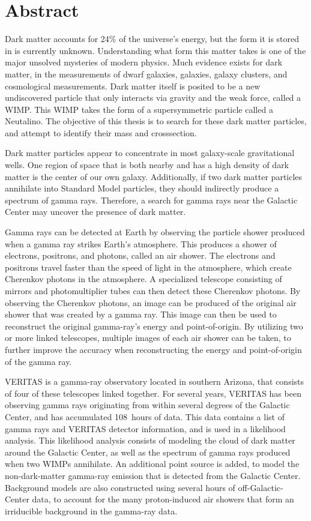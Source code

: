 \cleartooddpage[\thispagestyle{empty}]
\section*{Abstract}

Dark matter accounts for 24\% of the universe's energy, but the form it is stored in is currently unknown.
Understanding what form this matter takes is one of the major unsolved mysteries of modern physics.
Much evidence exists for dark matter, in the measurements of dwarf galaxies, galaxies, galaxy clusters, and cosmological measurements.
Dark matter itself is posited to be a new undiscovered particle that only interacts via gravity and the weak force, called a WIMP.
This WIMP takes the form of a supersymmetric particle called a Neutalino.
The objective of this thesis is to search for these dark matter particles, and attempt to identify their mass and crosssection.

Dark matter particles appear to concentrate in most galaxy-scale gravitational wells.
One region of space that is both nearby and has a high density of dark matter is the center of our own galaxy.
Additionally, if two dark matter particles annihilate into Standard Model particles, they should indirectly produce a spectrum of gamma rays.
Therefore, a search for gamma rays near the Galactic Center may uncover the presence of dark matter.

Gamma rays can be detected at Earth by observing the particle shower produced when a gamma ray strikes Earth's atmosphere.
This produces a shower of electrons, positrons, and photons, called an air shower.
The electrons and positrons travel faster than the speed of light in the atmosphere, which create Cherenkov photons in the atmosphere.
A specialized telescope consisting of mirrors and photomultiplier tubes can then detect these Cherenkov photons.
By observing the Cherenkov photons, an image can be produced of the original air shower that was created by a gamma ray.
This image can then be used to reconstruct the original gamma-ray's energy and point-of-origin.
By utilizing two or more linked telescopes, multiple images of each air shower can be taken, to further improve the accuracy when reconstructing the energy and point-of-origin of the gamma ray.

VERITAS is a gamma-ray observatory located in southern Arizona, that consists of four of these telescopes linked together.
For several years, VERITAS has been observing gamma rays originating from within several degrees of the Galactic Center, and has accumulated \SI{108}{hours} of data.
This data contains a list of gamma rays and VERITAS detector information, and is used in a likelihood analysis.
This likelihood analysis consists of modeling the cloud of dark matter around the Galactic Center, as well as the spectrum of gamma rays produced when two WIMPs annihilate.
An additional point source is added, to model the non-dark-matter gamma-ray emission that is detected from the Galactic Center.
Background models are also constructed using several hours of off-Galactic-Center data, to account for the many proton-induced air showers that form an irriducible background in the gamma-ray data.

